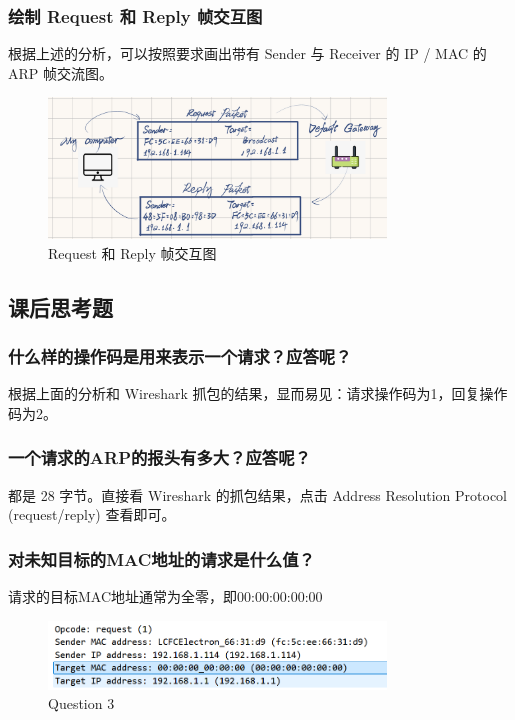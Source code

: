 \documentclass[14pt,a4paper,UTF8,twoside]{article}
\begin{document}
\subsubsection{绘制 Request 和 Reply 帧交互图}

根据上述的分析，可以按照要求画出带有 Sender 与 Receiver 的 IP / MAC 的 ARP 帧交流图。

\begin{figure}[H]
    \centering
    \includegraphics[width=0.8\textwidth]{lab4/draw2.png}
    \caption{Request 和 Reply 帧交互图}
\end{figure}

\subsection{课后思考题}

\subsubsection*{什么样的操作码是用来表示一个请求？应答呢？}
根据上面的分析和 Wireshark 抓包的结果，显而易见：请求操作码为1，回复操作码为2。

\subsubsection*{一个请求的ARP的报头有多大？应答呢？}
都是 28 字节。直接看 Wireshark 的抓包结果，点击 Address Resolution Protocol (request/reply) 查看即可。

\subsubsection*{对未知目标的MAC地址的请求是什么值？}
请求的目标MAC地址通常为全零，即00:00:00:00:00

\begin{figure}[H]
    \centering
    \includegraphics[width=0.8\textwidth]{lab4/q2.png}
    \caption{Question 3}
\end{figure}
\end{document}

